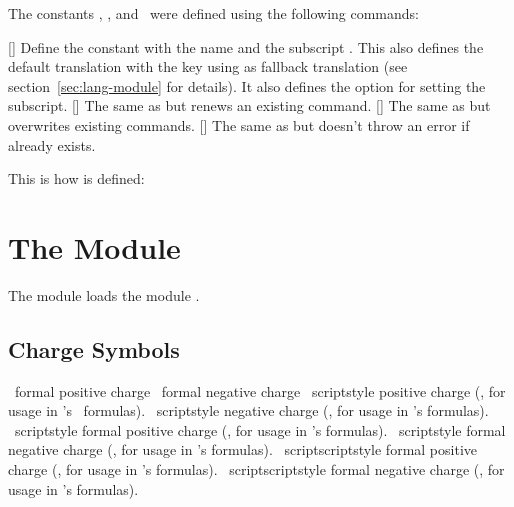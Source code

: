 \documentclass{chemmacros-manual}
\begin{document}
The constants \Ka, \Kb, and \Kw\ were defined using the
following commands:
\begin{commands}
  []
    Define the constant  with the name  and the subscript
    .  This also defines the default translation with the key
     using  as fallback translation (see
    section~\vref{sec:lang-module} for details).  It also defines the option
     for setting the subscript.
  []
    The same as  but renews an existing command.
  []
    The same as  but overwrites existing commands.
  []
    The same as  but doesn't throw an error if 
    already exists.
\end{commands}

This is how  is defined:
\begin{sourcecode}
  \NewChemEqConstant{}
\end{sourcecode}

\section{The  Module}\label{sec:charges-module}

The  module loads the module .

\subsection{Charge Symbols}
\begin{commands}
   \fplus\ formal positive charge
   \fminus\ formal negative charge
   \scrp\ scriptstyle positive charge (\eg, for usage in
    's~\cite{pkg:chemfig} formulas).
   \scrm\ scriptstyle negative charge (\eg, for usage in
    's formulas).
   \fscrp\ scriptstyle formal positive charge (\eg, for usage
    in 's formulas).
   \fscrm\ scriptstyle formal negative charge (\eg, for usage
    in 's formulas).
   \fsscrp\ scriptscriptstyle formal positive charge (\eg, for
    usage in 's formulas).
   \fsscrm\ scriptscriptstyle formal negative charge (\eg, for
    usage in 's formulas).
\end{commands}
\end{document}
